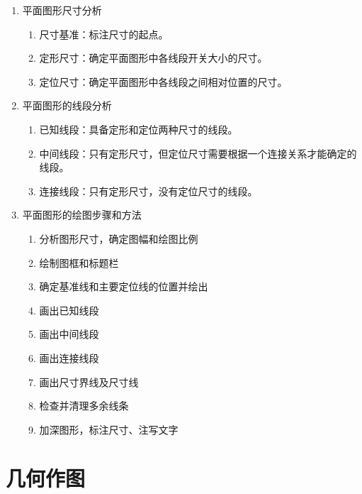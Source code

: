 \begin{enumerate}
\item 平面图形尺寸分析
\begin{enumerate}
\item 尺寸基准：标注尺寸的起点。
\item 定形尺寸：确定平面图形中各线段开关大小的尺寸。
\item 定位尺寸：确定平面图形中各线段之间相对位置的尺寸。
\end{enumerate}
\item 平面图形的线段分析
\begin{enumerate}
\item 已知线段：具备定形和定位两种尺寸的线段。
\item 中间线段：只有定形尺寸，但定位尺寸需要根据一个连接关系才能确定的线段。
\item 连接线段：只有定形尺寸，没有定位尺寸的线段。
\end{enumerate}
\item 平面图形的绘图步骤和方法
\begin{enumerate}
\item 分析图形尺寸，确定图幅和绘图比例
\item 绘制图框和标题栏
\item 确定基准线和主要定位线的位置并绘出
\item 画出已知线段
\item 画出中间线段
\item 画出连接线段
\item 画出尺寸界线及尺寸线
\item 检查并清理多余线条
\item 加深图形，标注尺寸、注写文字
\end{enumerate}
\end{enumerate}

\section{几何作图}


